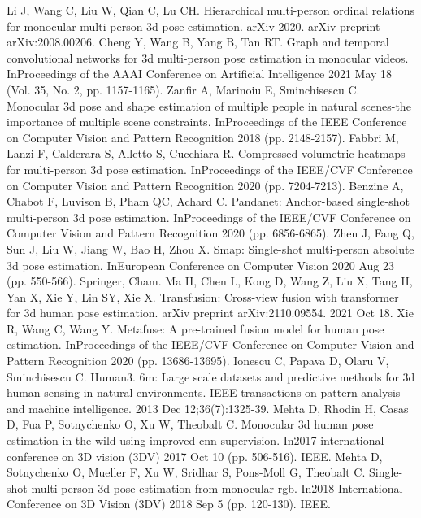 \documentclass[runningheads]{llncs}
\begin{document}
\begin{thebibliography}{8}
   Li J, Wang C, Liu W, Qian C, Lu CH. Hierarchical multi-person ordinal relations for monocular multi-person 3d pose estimation. arXiv 2020. arXiv preprint arXiv:2008.00206.
   Cheng Y, Wang B, Yang B, Tan RT. Graph and temporal convolutional networks for 3d multi-person pose estimation in monocular videos. InProceedings of the AAAI Conference on Artificial Intelligence 2021 May 18 (Vol. 35, No. 2, pp. 1157-1165).
   Zanfir A, Marinoiu E, Sminchisescu C. Monocular 3d pose and shape estimation of multiple people in natural scenes-the importance of multiple scene constraints. InProceedings of the IEEE Conference on Computer Vision and Pattern Recognition 2018 (pp. 2148-2157).
   Fabbri M, Lanzi F, Calderara S, Alletto S, Cucchiara R. Compressed volumetric heatmaps for multi-person 3d pose estimation. InProceedings of the IEEE/CVF Conference on Computer Vision and Pattern Recognition 2020 (pp. 7204-7213).
   Benzine A, Chabot F, Luvison B, Pham QC, Achard C. Pandanet: Anchor-based single-shot multi-person 3d pose estimation. InProceedings of the IEEE/CVF Conference on Computer Vision and Pattern Recognition 2020 (pp. 6856-6865).
   Zhen J, Fang Q, Sun J, Liu W, Jiang W, Bao H, Zhou X. Smap: Single-shot multi-person absolute 3d pose estimation. InEuropean Conference on Computer Vision 2020 Aug 23 (pp. 550-566). Springer, Cham.
   Ma H, Chen L, Kong D, Wang Z, Liu X, Tang H, Yan X, Xie Y, Lin SY, Xie X. Transfusion: Cross-view fusion with transformer for 3d human pose estimation. arXiv preprint arXiv:2110.09554. 2021 Oct 18.
   Xie R, Wang C, Wang Y. Metafuse: A pre-trained fusion model for human pose estimation. InProceedings of the IEEE/CVF Conference on Computer Vision and Pattern Recognition 2020 (pp. 13686-13695).
   Ionescu C, Papava D, Olaru V, Sminchisescu C. Human3. 6m: Large scale datasets and predictive methods for 3d human sensing in natural environments. IEEE transactions on pattern analysis and machine intelligence. 2013 Dec 12;36(7):1325-39.
   Mehta D, Rhodin H, Casas D, Fua P, Sotnychenko O, Xu W, Theobalt C. Monocular 3d human pose estimation in the wild using improved cnn supervision. In2017 international conference on 3D vision (3DV) 2017 Oct 10 (pp. 506-516). IEEE.
   Mehta D, Sotnychenko O, Mueller F, Xu W, Sridhar S, Pons-Moll G, Theobalt C. Single-shot multi-person 3d pose estimation from monocular rgb. In2018 International Conference on 3D Vision (3DV) 2018 Sep 5 (pp. 120-130). IEEE.
\end{thebibliography}
\end{document}
